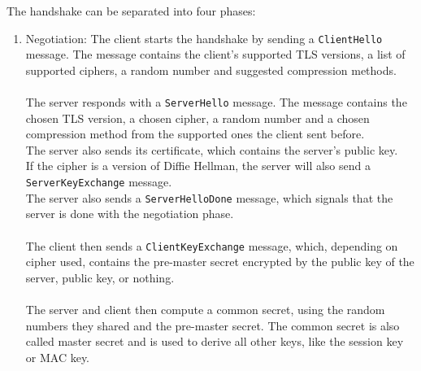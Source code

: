 The handshake can be separated into four phases:
\begin{enumerate}
    \item Negotiation: The client starts the handshake by sending a \texttt{ClientHello} message. The message contains the client's supported TLS versions, a list of supported ciphers, a random number and suggested compression methods.
    \\\\
    The server responds with a \texttt{ServerHello} message. The message contains the chosen TLS version, a chosen cipher, a random number and a chosen compression method from the supported ones the client sent before.
    \\
    The server also sends its certificate, which contains the server's public key.
    \\
    If the cipher is a version of Diffie Hellman, the server will also send a \texttt{ServerKeyExchange} message.
    \\
    The server also sends a \texttt{ServerHelloDone} message, which signals that the server is done with the negotiation phase.
    \\\\
    The client then sends a \texttt{ClientKeyExchange} message, which, depending on cipher used, contains the pre-master secret encrypted by the public key of the server, public key, or nothing.
    \\\\
    The server and client then compute a common secret, using the random numbers they shared and the pre-master secret. The common secret is also called master secret and is used to derive all other keys, like the session key or MAC key.
    
\end{enumerate}
